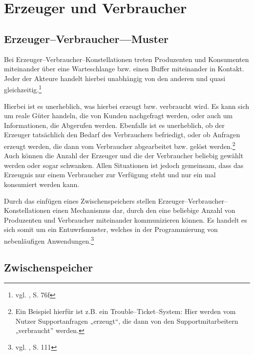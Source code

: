 
\section{Erzeuger und Verbraucher} %
\label{sec:erzeuger_und_verbraucher}

\subsection{Erzeuger–Verbraucher—Muster} %
\label{sub:erzeuger_verbraucher_muster}

Bei Erzeuger–Verbraucher–Konstellationen treten Produzenten und Konsumenten miteinander über eine Warteschlange bzw. einen Buffer miteinander in Kontakt. Jeder der Akteure handelt hierbei unabhängig von den anderen und quasi gleichzeitig.\footnote{vgl. \cite{osdi}, S. 76f}

Hierbei ist es unerheblich, was hierbei erzeugt bzw. verbraucht wird. Es kann sich um reale Güter handeln, die von Kunden nachgefragt werden, oder auch um Informationen, die Abgerufen werden. Ebenfalls ist es unerheblich, ob der Erzeuger tatsächlich den Bedarf des Verbrauchers befriedigt, oder ob Anfragen erzeugt werden, die dann vom Verbraucher abgearbeitet bzw. gelöst werden.\footnote{Ein Beispiel hierfür ist z.B. ein Trouble–Ticket–System: Hier werden vom Nutzer Supportanfragen „erzeugt“, die dann von den Supportmitarbeitern „verbraucht” werden.} 
Auch können die Anzahl der Erzeuger und die der Verbraucher beliebig gewählt werden oder sogar schwanken. Allen Situationen ist jedoch gemeinsam, dass das Erzeugnis nur einem Verbraucher zur Verfügung steht und nur ein mal konsumiert werden kann.

Durch das einfügen eines Zwischenspeichers stellen Erzeuger–\-Verbraucher–\-Kon\-stel\-lation\-en einen Mechanismus dar, 
durch den eine beliebige Anzahl von Produzenten und Verbraucher miteinander kommunizieren können.
Es handelt es sich somit um ein Entuwrfsmuster, welches in der Programmierung von nebenläufigen Anwendungen.\footnote{vgl. \cite{openmp}, S. 111} 


\subsection{Zwischenspeicher} %
\label{sub:buffer}

